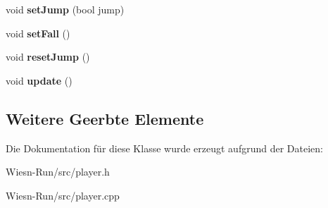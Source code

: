 \begin{DoxyCompactItemize}
\item 
\hypertarget{classPlayer_a592d25e24da471c9d92d90e5019a581b}{void {\bfseries set\-Jump} (bool jump)}\label{classPlayer_a592d25e24da471c9d92d90e5019a581b}

\item 
\hypertarget{classPlayer_a35738295086ff15f3317a2ce46a25f30}{void {\bfseries set\-Fall} ()}\label{classPlayer_a35738295086ff15f3317a2ce46a25f30}

\item 
\hypertarget{classPlayer_a9f859b8531d3af6262e6f925b8702cc8}{void {\bfseries reset\-Jump} ()}\label{classPlayer_a9f859b8531d3af6262e6f925b8702cc8}

\item 
\hypertarget{classPlayer_a82c3476f3e65a4e2ac6bcd040771bdd4}{void {\bfseries update} ()}\label{classPlayer_a82c3476f3e65a4e2ac6bcd040771bdd4}

\end{DoxyCompactItemize}
\subsection*{Weitere Geerbte Elemente}


Die Dokumentation für diese Klasse wurde erzeugt aufgrund der Dateien\-:\begin{DoxyCompactItemize}
\item 
Wiesn-\/\-Run/src/player.\-h\item 
Wiesn-\/\-Run/src/player.\-cpp\end{DoxyCompactItemize}
